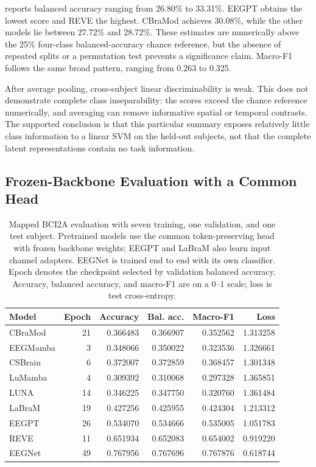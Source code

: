 \documentclass{article}
\begin{document}
 reports balanced accuracy ranging from 26.80\%
to 33.31\%. EEGPT obtains the lowest score and REVE the highest.
CBraMod achieves 30.08\%, while the other models lie between
27.72\% and 28.72\%. These estimates are numerically above the 25\%
four-class balanced-accuracy chance reference, but the absence of repeated
splits or a permutation test prevents a significance claim. Macro-F1
follows the same broad pattern, ranging from 0.263 to 0.325.

After average pooling, cross-subject linear discriminability is weak.
This does not demonstrate complete class inseparability:
the scores exceed the chance reference numerically, and averaging can
remove informative spatial or temporal contrasts. The supported conclusion
is that this particular summary exposes relatively little class information
to a linear SVM on the held-out subjects, not that the complete latent
representations contain no task information.

\subsection{Frozen-Backbone Evaluation with a Common Head}
\label{sec:linear-probing}

\begin{table}[t]
    \centering
    \caption{Mapped BCI2A evaluation with seven training, one validation, and
    one test subject. Pretrained models use the common token-preserving
    head with frozen backbone weights; EEGPT and LaBraM also learn input
    channel adapters. EEGNet is trained end to end with its own classifier.
    Epoch denotes the checkpoint selected by validation balanced accuracy.
    Accuracy, balanced accuracy, and macro-F1 are on a 0--1 scale; loss is
    test cross-entropy.}
    \label{tab:common-head-results}
    \small
    \begin{tabular}{lrrrrr}
        \toprule
        Model & Epoch & Accuracy & Bal. acc. & Macro-F1 & Loss \\
        \midrule
CBraMod & 21 & 0.366483 & 0.366907 & 0.352562 & 1.313258 \\
EEGMamba & 3 & 0.348066 & 0.350022 & 0.323536 & 1.326661 \\
CSBrain & 6 & 0.372007 & 0.372859 & 0.368457 & 1.301348 \\
LuMamba & 4 & 0.309392 & 0.310068 & 0.297328 & 1.365851 \\
LUNA & 14 & 0.346225 & 0.347750 & 0.320760 & 1.361484 \\
LaBraM & 19 & 0.427256 & 0.425955 & 0.424304 & 1.213312 \\
EEGPT & 26 & 0.534070 & 0.534666 & 0.535005 & 1.051783 \\
REVE & 11 & 0.651934 & 0.652083 & 0.654002 & 0.919220 \\
        \midrule
EEGNet & 49 & 0.767956 & 0.767696 & 0.767876 & 0.618744 \\
        \bottomrule
    \end{tabular}
\end{table}
\end{document}
